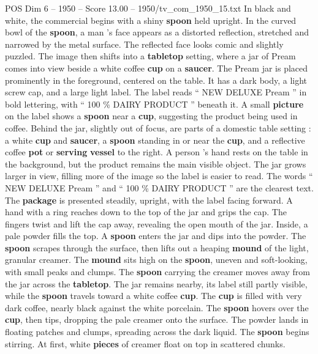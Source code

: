 \begin{textsample}{POS Dim 6 – 1950 – Score 13.00 – 1950/tv\_com\_1950\_15.txt}  \label{ex:f6_pos_012}
In black and white, the commercial begins with a shiny \textbf{spoon} held upright.
In the curved bowl of the \textbf{spoon}, a man ’s face appears as a distorted reflection, stretched and narrowed by the metal surface.
The reflected face looks comic and slightly puzzled.
The image then shifts into a \textbf{tabletop} setting, where a jar of Pream comes into view beside a white coffee \textbf{cup} on a \textbf{saucer}.
The Pream jar is placed prominently in the foreground, centered on the table.
It has a dark body, a light screw cap, and a large light label.
The label reads “ NEW DELUXE Pream ” in bold lettering, with “ 100 \% DAIRY PRODUCT ” beneath it.
A small \textbf{picture} on the label shows a \textbf{spoon} near a \textbf{cup}, suggesting the product being used in coffee.
Behind the jar, slightly out of focus, are parts of a domestic table setting : a white \textbf{cup} and \textbf{saucer}, a \textbf{spoon} standing in or near the \textbf{cup}, and a reflective coffee \textbf{pot} or \textbf{serving} \textbf{vessel} to the right.
A person ’s hand rests on the table in the background, but the product remains the main visible object.
The jar grows larger in view, filling more of the image so the label is easier to read.
The words “ NEW DELUXE Pream ” and “ 100 \% DAIRY PRODUCT ” are the clearest text.
The \textbf{package} is presented steadily, upright, with the label facing forward.
A hand with a ring reaches down to the top of the jar and grips the cap.
The fingers twist and lift the cap away, revealing the open mouth of the jar.
Inside, a pale powder fills the top.
A \textbf{spoon} enters the jar and dips into the powder.
The \textbf{spoon} scrapes through the surface, then lifts out a heaping \textbf{mound} of the light, granular creamer.
The \textbf{mound} sits high on the \textbf{spoon}, uneven and soft-looking, with small peaks and clumps.
The \textbf{spoon} carrying the creamer moves away from the jar across the \textbf{tabletop}.
The jar remains nearby, its label still partly visible, while the \textbf{spoon} travels toward a white coffee \textbf{cup}.
The \textbf{cup} is filled with very dark coffee, nearly black against the white porcelain.
The \textbf{spoon} hovers over the \textbf{cup}, then tips, dropping the pale creamer onto the surface.
The powder lands in floating patches and clumps, spreading across the dark liquid.
The \textbf{spoon} begins stirring.
At first, white \textbf{pieces} of creamer float on top in scattered chunks.

\end{textsample}
